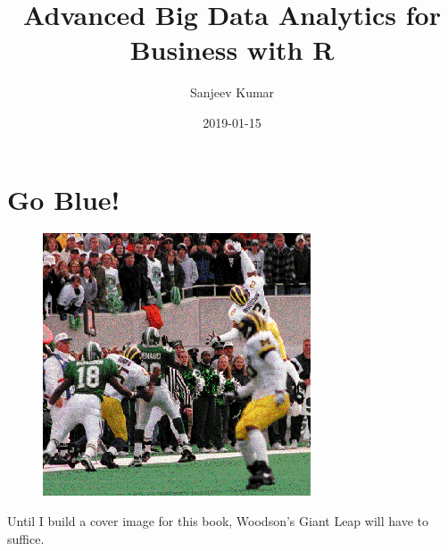 \documentclass[]{krantz}
\title{Advanced Big Data Analytics for Business with R}
\author{Sanjeev Kumar}
\date{2019-01-15}
\renewenvironment{quote}{\begin{VF}}{\end{VF}}
\theoremstyle{definition}
\theoremstyle{definition}
\theoremstyle{definition}
\theoremstyle{remark}
\begin{document}
\maketitle


\thispagestyle{empty}

\begin{center}

\par{}

\end{center}

\setlength{\abovedisplayskip}{-5pt}
\setlength{\abovedisplayshortskip}{-5pt}

{
\hypersetup{linkcolor=black}
\setcounter{tocdepth}{2}
\tableofcontents
}
\listoftables
\listoffigures
\chapter*{Go Blue!}\label{go-blue}


\begin{figure}
\centering
\includegraphics{images/woodson.png}
\caption{}
\end{figure}

\begin{quote}
Until I build a cover image for this book, Woodson's Giant Leap will
have to suffice.
\end{quote}
\end{document}
